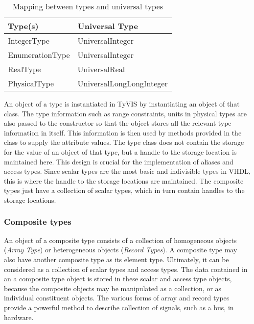 \documentclass[11pt]{article}
\begin{document}
\begin{table}
  \begin{center}
    \begin{tabular}{||ll||}\hline\hline
      \textbf{Type(s)} & \textbf{Universal Type} \\\hline
      IntegerType      & UniversalInteger \\
      EnumerationType  & UniversalInteger \\
      RealType         & UniversalReal \\
      PhysicalType     & UniversalLongLongInteger \\\hline\hline
    \end{tabular}
  \end{center}
  \caption{Mapping between types and universal types}
  \label{tab:universal_types}
\end{table}


An object of a type is instantiated in TyVIS by instantiating an object
of that class.  The type information such as range constraints, units in 
physical types are also passed to the constructor so that the object stores 
all the relevant type information in itself.  This information is then used 
by methods provided in the class to supply the attribute values.  The type 
class does not contain the storage for the value of an object of that type, 
but a handle to the storage location is maintained here.  This design is 
crucial for the implementation of aliases and access types.  Since scalar 
types are the most basic and indivisible types in VHDL, this is where the 
handle to the storage locations are maintained.  The composite types just 
have a collection of scalar types, which in turn contain handles to the 
storage locations.

\subsubsection{Composite types}

An object of a composite type consists of a collection of homogeneous
objects (\emph{Array Type}) or heterogeneous objects (\emph{Record
Types}).  A composite type may also have another composite type as its
element type.  Ultimately, it can be considered as a collection of
scalar types and access types.  The data contained in an a composite
type object is stored in these scalar and access type objects, because
the composite objects may be manipulated as a collection, or as
individual constituent objects.  The various forms of array and record
types provide a powerful method to describe collection of signals,
such as a bus, in hardware.
\end{document}
